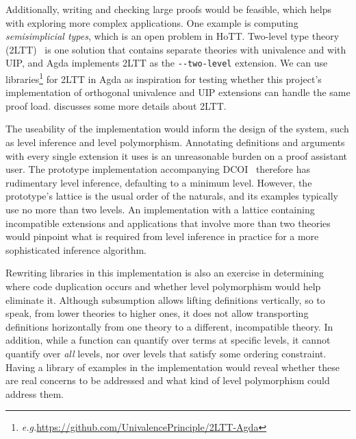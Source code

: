 \documentclass{article}
\makeatletter
\newcommand{\eg}{\textit{e.g.}\@\xspace}
\newcommand{\code}[1]{\texttt{#1}}
\makeatother
\begin{document}
Additionally, writing and checking large proofs would be feasible,
which helps with exploring more complex applications.
One example is computing \emph{semisimplicial types},
which is an open problem in HoTT.
Two-level type theory (2LTT)~\citep{2ls,2ltt} is one solution
that contains separate theories with univalence and with UIP,
and Agda implements 2LTT as the \code{-{}-two-level} extension.
We can use libraries\footnote{\eg \url{https://github.com/UnivalencePrinciple/2LTT-Agda}}
for 2LTT in Agda as inspiration for testing whether this project's implementation
of orthogonal univalence and UIP extensions can handle the same proof load.
 discusses some more details about 2LTT.

The useability of the implementation would inform the design of the system,
such as level inference and level polymorphism.
Annotating definitions and arguments with every single extension it uses
is an unreasonable burden on a proof assistant user.
The prototype implementation accompanying DCOI~\citep{dcoi-artifact}
therefore has rudimentary level inference, defaulting to a minimum level.
However, the prototype's lattice is the usual order of the naturals,
and its examples typically use no more than two levels.
An implementation with a lattice containing incompatible extensions
and applications that involve more than two theories
would pinpoint what is required from level inference in practice
for a more sophisticated inference algorithm.

Rewriting libraries in this implementation is also an exercise
in determining where code duplication occurs
and whether level polymorphism would help eliminate it.
Although subsumption allows lifting definitions vertically,
so to speak, from lower theories to higher ones,
it does not allow transporting definitions horizontally
from one theory to a different, incompatible theory.
In addition, while a function can quantify over terms at specific levels,
it cannot quantify over \emph{all} levels,
nor over levels that satisfy some ordering constraint.
Having a library of examples in the implementation
would reveal whether these are real concerns to be addressed
and what kind of level polymorphism could address them.

\end{document}

